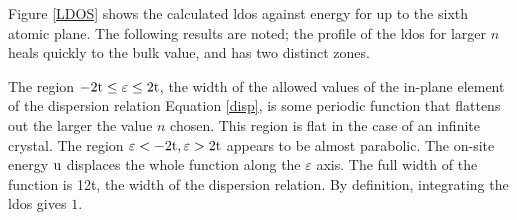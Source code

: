 \documentclass[a4paper, 12pt]{article}
\begin{document}
Figure \ref{LDOS} shows the calculated \gls{ldos} against energy for up to the sixth atomic plane. The following results are noted; the profile of the \gls{ldos} for larger $n$ heals quickly to the bulk value, and has two distinct zones. 
\\\par The region $-2\rm t \leq \varepsilon \leq 2t$, the width of the allowed values of the in-plane element of the dispersion relation Equation \eqref{disp}, is some periodic function that flattens out the larger the value $n$ chosen. This region is flat in the case of an infinite crystal. The region $\varepsilon<-2\rm t, \varepsilon>2t$ appears to be almost parabolic. The on-site energy $\rm u$ displaces the whole function along the $\varepsilon$ axis. The full width of the function is 12t, the width of the dispersion relation.
By definition, integrating the \gls{ldos} gives $1$.
\end{document}

